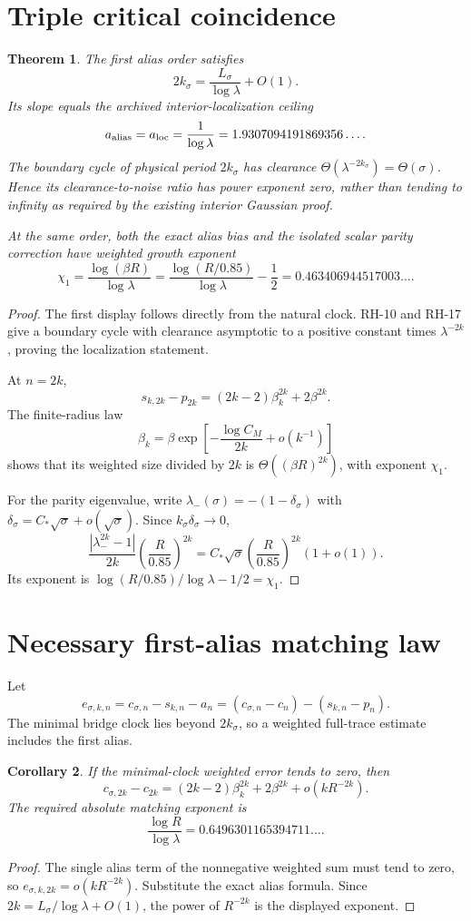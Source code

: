 \documentclass[11pt]{article}
\newtheorem{theorem}{Theorem}[section]
\newtheorem{corollary}[theorem]{Corollary}
\theoremstyle{remark}\newtheorem{remark}[theorem]{Remark}
\begin{document}
\section{Triple critical coincidence}
\begin{theorem}\label{thm:coincidence}
The first alias order satisfies
\[
 2k_\sigma=\frac{L_\sigma}{\log\lambda}+O(1).
\]
Its slope equals the archived interior-localization ceiling
\[
 a_{\rm alias}=a_{\rm loc}=\frac1{\log\lambda}
 =1.9307094191869356\ldots.
\]
The boundary cycle of physical period $2k_\sigma$ has clearance
$\Theta(\lambda^{-2k_\sigma})=\Theta(\sigma)$.  Hence its
clearance-to-noise ratio has power exponent zero, rather than tending to
infinity as required by the existing interior Gaussian proof.

At the same order, both the exact alias bias and the isolated scalar parity
correction have weighted growth exponent
\[
 \chi_1=\frac{\log(\beta R)}{\log\lambda}
 =\frac{\log(R/0.85)}{\log\lambda}-\frac12
 =0.463406944517003\ldots.
\]
\end{theorem}
\begin{proof}
The first display follows directly from the natural clock.  RH-10 and RH-17
give a boundary cycle with clearance asymptotic to a positive constant times
$\lambda^{-2k}$, proving the localization statement.

At $n=2k$,
\[
 s_{k,2k}-p_{2k}=(2k-2)\beta_k^{2k}+2\beta^{2k}.
\]
The finite-radius law
\[
 \beta_k=\beta\exp\left[-\frac{\log C_M}{2k}+o(k^{-1})\right]
\]
shows that its weighted size divided by $2k$ is
$\Theta((\beta R)^{2k})$, with exponent $\chi_1$.

For the parity eigenvalue, write
$\lambda_-(\sigma)=-(1-\delta_\sigma)$ with
$\delta_\sigma=C_*\sqrt\sigma+o(\sqrt\sigma)$.  Since
$k_\sigma\delta_\sigma\to0$,
\[
 \frac{|\lambda_-^{2k}-1|}{2k}
 \left(\frac R{0.85}\right)^{2k}
 =C_*\sqrt\sigma
 \left(\frac R{0.85}\right)^{2k}(1+o(1)).
\]
Its exponent is
$\log(R/0.85)/\log\lambda-1/2=\chi_1$.
\end{proof}

\section{Necessary first-alias matching law}
Let
\[
 e_{\sigma,k,n}=c_{\sigma,n}-s_{k,n}-a_n
 =(c_{\sigma,n}-c_n)-(s_{k,n}-p_n).
\]
The minimal bridge clock lies beyond $2k_\sigma$, so a weighted full-trace
estimate includes the first alias.

\begin{corollary}\label{cor:matching}
If the minimal-clock weighted error tends to zero, then
\[
 c_{\sigma,2k}-c_{2k}
 =(2k-2)\beta_k^{2k}+2\beta^{2k}
 +o(kR^{-2k}).
\]
The required absolute matching exponent is
\[
 \frac{\log R}{\log\lambda}
 =0.6496301165394711\ldots.
\]
\end{corollary}
\begin{proof}
The single alias term of the nonnegative weighted sum must tend to zero, so
$e_{\sigma,k,2k}=o(kR^{-2k})$.  Substitute the exact alias formula.  Since
$2k=L_\sigma/\log\lambda+O(1)$, the power of $R^{-2k}$ is the displayed
exponent.
\end{proof}
\end{document}
